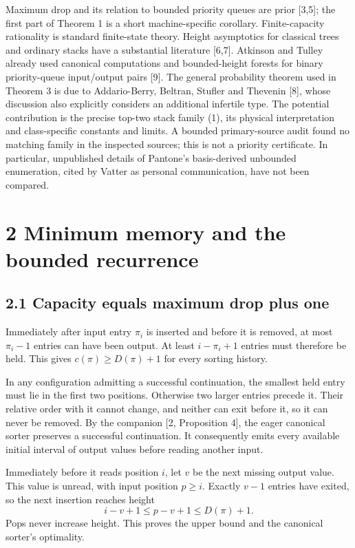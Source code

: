 \documentclass[11pt,letterpaper]{article}
\begin{document}
Maximum drop and its relation to bounded priority queues are prior
{[}3,5{]}; the first part of Theorem 1 is a short machine-specific
corollary. Finite-capacity rationality is standard finite-state theory.
Height asymptotics for classical trees and ordinary stacks have a
substantial literature {[}6,7{]}. Atkinson and Tulley already used
canonical computations and bounded-height forests for binary
priority-queue input/output pairs {[}9{]}. The general probability
theorem used in Theorem 3 is due to Addario-Berry, Beltran, Stufler and
Thevenin {[}8{]}, whose discussion also explicitly considers an
additional infertile type. The potential contribution is the precise
top-two stack family (1), its physical interpretation and class-specific
constants and limits. A bounded primary-source audit found no matching
family in the inspected sources; this is not a priority certificate. In
particular, unpublished details of Pantone's basis-derived unbounded
enumeration, cited by Vatter as personal communication, have not been
compared.

\section{2 Minimum memory and the bounded
recurrence}\label{minimum-memory-and-the-bounded-recurrence}

\subsection{2.1 Capacity equals maximum drop plus
one}\label{capacity-equals-maximum-drop-plus-one}

Immediately after input entry \(\pi_i\) is inserted and before it is
removed, at most \(\pi_i-1\) entries can have been output. At least
\(i-\pi_i+1\) entries must therefore be held. This gives
\(c(\pi)\ge D(\pi)+1\) for every sorting history.

In any configuration admitting a successful continuation, the smallest
held entry must lie in the first two positions. Otherwise two larger
entries precede it. Their relative order with it cannot change, and
neither can exit before it, so it can never be removed. By the companion
{[}2, Proposition 4{]}, the eager canonical sorter preserves a
successful continuation. It consequently emits every available initial
interval of output values before reading another input.

Immediately before it reads position \(i\), let \(v\) be the next
missing output value. This value is unread, with input position
\(p\ge i\). Exactly \(v-1\) entries have exited, so the next insertion
reaches height \[i-v+1\le p-v+1\le D(\pi)+1.\] Pops never increase
height. This proves the upper bound and the canonical sorter's
optimality.
\end{document}
